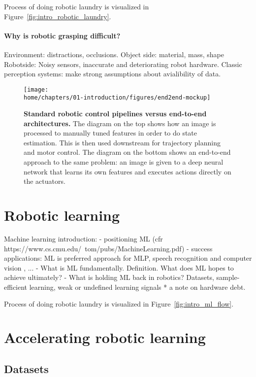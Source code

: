 \documentclass[\home/main.tex]{subfiles}
\begin{document}
Process of doing robotic laundry is visualized in Figure~\ref{fig:intro_robotic_laundry}.


\paragraph{Why is robotic grasping difficult?}
Environment: distractions, occlusions.
Object side: material, mass, shape
Robotside: Noisy sensors, inaccurate and deteriorating robot hardware.
Classic perception systems: make strong assumptions about avialibility of data. 

\begin{figure}
    \texttt{[image: \\home/chapters/01-introduction/figures/end2end-mockup]}
    \caption{\textbf{Standard robotic control pipelines versus end-to-end architectures.} The diagram on the top shows how an image is processed to manually tuned features in order to do state estimation. This is then used downstream for trajectory planning and motor control. The diagram on the bottom shows an end-to-end approach to the same problem: an image is given to a deep neural network that learns its own features and executes actions directly on the actuators.}
    \label{fig:intro_end2end}
\end{figure}

\section{Robotic learning}
Machine learning introduction:
    - positioning ML (cfr https://www.cs.cmu.edu/~tom/pubs/MachineLearning.pdf)
    - success applications: ML is preferred approach for MLP, speech recognition and computer vision , ... 
    - What is ML fundamentally. Definition. What does ML hopes to achieve ultimately? 
    - What is holding ML back in robotics? 
        Datasets, sample-efficient learning, weak or undefined learning signals 
        * a note on hardware debt.

Process of doing robotic laundry is visualized in Figure~\ref{fig:intro_ml_flow}.


\section{Accelerating robotic learning}
\subsection{Datasets}
\end{document}
